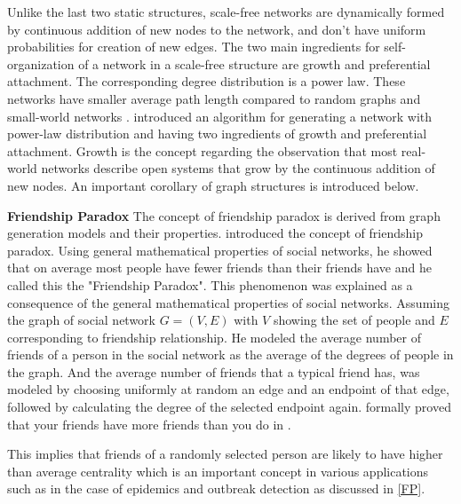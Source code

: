 \documentclass[11pt,a4paper]{article}
\begin{document}
Unlike the last two static structures,  scale-free networks are dynamically formed by continuous addition of new nodes to the network, and don't have uniform probabilities for creation of new edges. The two main ingredients for self-organization of a network in a scale-free structure are growth and preferential attachment. The corresponding degree distribution is a power law. These networks have smaller average path length compared to random graphs and small-world networks \cite{wangStructure}. %
\citet{barabasi}  introduced an algorithm for generating a network with power-law distribution and having two ingredients of growth and preferential attachment. Growth is the concept regarding the observation that most real-world networks describe open systems that grow by the continuous addition of new nodes.
An important corollary of graph structures is introduced below.


\textbf{Friendship Paradox} The concept of friendship paradox is derived from graph generation models and their properties. \citet{feld} introduced the concept of friendship paradox. Using general mathematical properties of social networks, he showed that on average most people have fewer friends than their friends have and he called this the "Friendship Paradox". This phenomenon was explained as a consequence of the general mathematical properties of social networks. Assuming the graph of social network $G = (V, E)$ with $V$ showing the set of people and $E$ corresponding to friendship relationship. He modeled the average number of friends of a person in the social network as the average of the degrees of people in the graph. And the average number of friends that a typical friend has, was modeled by choosing uniformly at random an edge and an endpoint of that edge, followed by calculating the degree of the selected endpoint again. \citeauthor{feld} formally proved that your friends have more friends than you do in \cite{feld}.

This implies that friends of a randomly selected person are likely to have higher than average centrality which is an important concept in various applications such as in the case of epidemics and outbreak detection as discussed in \ref{FP}.
\end{document}

